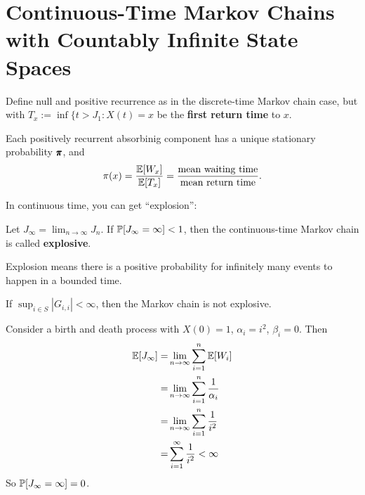 \section{Continuous-Time Markov Chains with Countably Infinite State Spaces}

Define null and positive recurrence as in the discrete-time Markov chain case, but with \textcolor{myblue}{$T_x := \inf \{t > J_1 : X(t) = x$ be the \textbf{first return time} to $x$}.

\begin{proposition}
    Each positively recurrent absorbinig component has a unique stationary probability $\pmb{\pi}$, and 
    \begin{equation*}
        \pi(x) = \frac{\mathbb{E} [ W_x ]}{\mathbb{E} [T_x]} = \frac{\text{mean waiting time}}{\text{mean return time}}.
    \end{equation*}
\end{proposition}

In continuous time, you can get ``explosion'': 
\begin{definition}[Explosion]
    Let $J_\infty = \lim_{n\to\infty} J_n$. If $\mathbb{P} [J_\infty = \infty] < 1$, then the continuous-time Markov chain is called \textbf{explosive}.
\end{definition}
\begin{remark}
    Explosion means there is a positive probability for infinitely many events to happen in a bounded time.
\end{remark}

\begin{proposition}
    If $\sup_{i\in S} |G_{i,i}| < \infty$, then the Markov chain is not explosive.
\end{proposition}

\begin{example}
    Consider a birth and death process with $X(0) = 1$, $\alpha_i = i^2$, $\beta_i = 0$. Then
    \begin{align*}
        \mathbb{E} [J_\infty] = & \lim_{n \to \infty} \sum_{i=1}^n \mathbb{E} [W_i] \\
        = & \lim_{n \to \infty} \sum_{i=1}^n \frac{1}{\alpha_i} \\ 
        = &  \lim_{n \to \infty} \sum_{i=1}^n \frac{1}{i^2} \\ 
        = & \sum_{i=1}^\infty \frac{1}{i^2} < \infty
    \end{align*}
    So $\mathbb{P} [J_\infty = \infty] = 0$.
\end{example}

